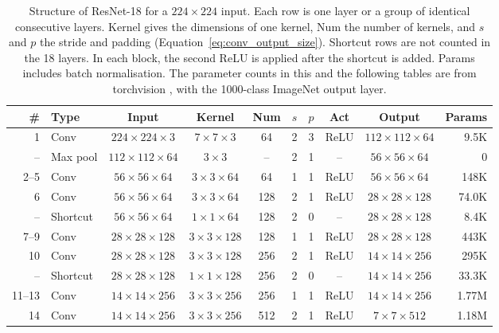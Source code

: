 \begin{table}[!htb]
\centering
\setlength{\tabcolsep}{3.5pt}
\caption{Structure of ResNet-18 for a $224\times224$ input. Each row is one layer or a group of identical consecutive layers. Kernel gives the dimensions of one kernel, Num the number of kernels, and $s$ and $p$ the stride and padding (Equation~\ref{eq:conv_output_size}). Shortcut rows are not counted in the 18 layers. In each block, the second ReLU is applied after the shortcut is added. Params includes batch normalisation. The parameter counts in this and the following tables are from torchvision \citep{torchvision2016}, with the 1000-class ImageNet output layer.}
\label{tab:resnet_layers}
\begin{tabular}{rlcccccccr}
\toprule
\textbf{\#} & \textbf{Type} & \textbf{Input} & \textbf{Kernel} & \textbf{Num} & $s$ & $p$ & \textbf{Act} & \textbf{Output} & \textbf{Params} \\
\midrule
1        & Conv            & $224\times224\times3$ & $7\times7\times3$     & 64   & 2 & 3 & ReLU    & $112\times112\times64$ & 9.5K  \\
--       & Max pool        & $112\times112\times64$ & $3\times3$           & --   & 2 & 1 & --      & $56\times56\times64$   & 0     \\
2--5     & Conv            & $56\times56\times64$  & $3\times3\times64$    & 64   & 1 & 1 & ReLU    & $56\times56\times64$   & 148K  \\
6        & Conv            & $56\times56\times64$  & $3\times3\times64$    & 128  & 2 & 1 & ReLU    & $28\times28\times128$  & 74.0K \\
--       & Shortcut        & $56\times56\times64$  & $1\times1\times64$    & 128  & 2 & 0 & --      & $28\times28\times128$  & 8.4K  \\
7--9     & Conv            & $28\times28\times128$ & $3\times3\times128$   & 128  & 1 & 1 & ReLU    & $28\times28\times128$  & 443K  \\
10       & Conv            & $28\times28\times128$ & $3\times3\times128$   & 256  & 2 & 1 & ReLU    & $14\times14\times256$  & 295K  \\
--       & Shortcut        & $28\times28\times128$ & $1\times1\times128$   & 256  & 2 & 0 & --      & $14\times14\times256$  & 33.3K \\
11--13   & Conv            & $14\times14\times256$ & $3\times3\times256$   & 256  & 1 & 1 & ReLU    & $14\times14\times256$  & 1.77M \\
14       & Conv            & $14\times14\times256$ & $3\times3\times256$   & 512  & 2 & 1 & ReLU    & $7\times7\times512$    & 1.18M \\

\end{tabular}
\end{table}
